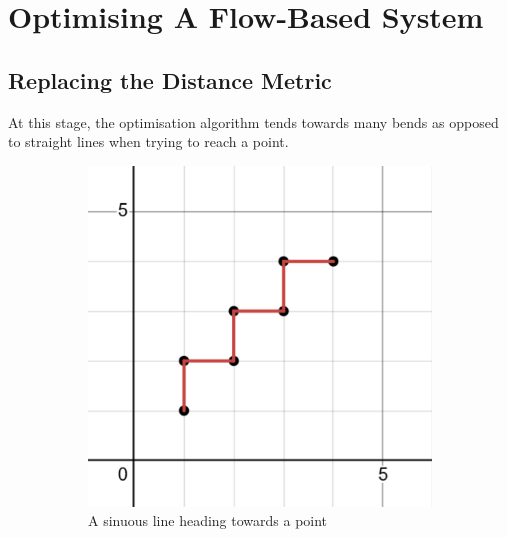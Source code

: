 \section{Optimising A Flow-Based System}
\subsection{Replacing the Distance Metric}\label{definingdistance}
At this stage, the optimisation algorithm tends towards many bends as opposed to straight lines when trying to reach a point.

\begin{figure}[H]
    \begin{subfigure}{0.4\linewidth}\label{fig:Sinuous Line}
        \includegraphics[width=\linewidth]{zig-zag.png}
        \caption{A sinuous line heading towards a point}
    \end{subfigure}
    \hfill
    \begin{subfigure}{0.4\linewidth}

\end{subfigure}
\end{figure}
